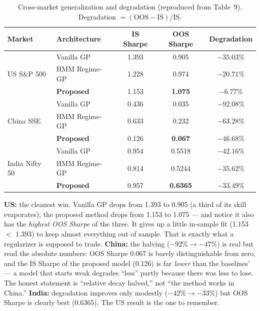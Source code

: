 \documentclass[11pt,a4paper]{article}
\begin{document}
\begin{table}[H]
\centering\small
\caption{Cross-market generalization and degradation (reproduced from
Table~9). Degradation $=(\text{OOS}-\text{IS})/\text{IS}$.}
\label{tab:cross}
\begin{tabular}{@{}llccc@{}}
\toprule
\textbf{Market} & \textbf{Architecture} & \textbf{IS Sharpe} &
\textbf{OOS Sharpe} & \textbf{Degradation} \\
\midrule
\multirow{3}{*}{US S\&P 500}
  & Vanilla GP        & 1.393 & 0.905  & $-35.03\%$ \\
  & HMM Regime-GP     & 1.228 & 0.974  & $-20.71\%$ \\
  & \textbf{Proposed} & 1.153 & \textbf{1.075} & \textbf{$-6.77\%$} \\
\midrule
\multirow{3}{*}{China SSE}
  & Vanilla GP        & 0.436 & 0.035  & $-92.08\%$ \\
  & HMM Regime-GP     & 0.633 & 0.232  & $-63.28\%$ \\
  & \textbf{Proposed} & 0.126 & \textbf{0.067} & \textbf{$-46.68\%$} \\
\midrule
\multirow{3}{*}{India Nifty 50}
  & Vanilla GP        & 0.954 & 0.5518 & $-42.16\%$ \\
  & HMM Regime-GP     & 0.814 & 0.5244 & $-35.62\%$ \\
  & \textbf{Proposed} & 0.957 & \textbf{0.6365} & \textbf{$-33.49\%$} \\
\bottomrule
\end{tabular}
\end{table}

\begin{plaineng}
\textbf{US:} the cleanest win. Vanilla GP drops from 1.393 to 0.905 (a third
of its skill evaporates); the proposed method drops from 1.153 to 1.075 ---
and notice it also has the \emph{highest OOS Sharpe} of the three. It gives up
a little in-sample fit (1.153 $<$ 1.393) to keep almost everything out of
sample. That is exactly what a regularizer is supposed to trade.
\textbf{China:} the halving ($-92\% \to -47\%$) is real but read the absolute
numbers: OOS Sharpe 0.067 is barely distinguishable from zero, and the IS
Sharpe of the proposed model (0.126) is far \emph{lower} than the baselines'
--- a model that starts weak degrades ``less'' partly because there was less
to lose. The honest statement is ``relative decay halved,'' not ``the method
works in China.'' \textbf{India:} degradation improves only modestly
($-42\% \to -33\%$) but OOS Sharpe is clearly best (0.6365). The US result is
the one to remember.
\end{plaineng}
\end{document}
